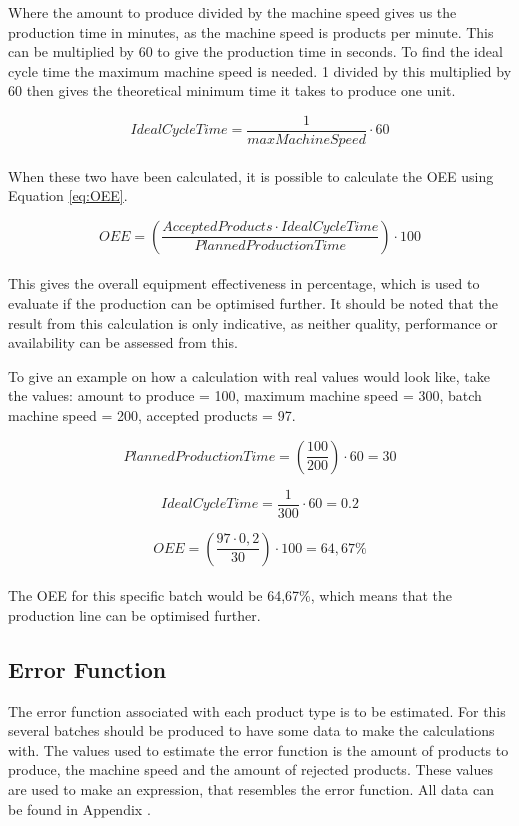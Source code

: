 Where the amount to produce divided by the machine speed gives us the production
time in minutes, as the machine speed is products per minute. This can be
multiplied by 60 to give the production time in seconds. To find the ideal cycle
time the maximum machine speed is needed. 1 divided by this multiplied by 60
then gives the theoretical minimum time it takes to produce one unit.

\[IdealCycleTime = \frac{1}{maxMachineSpeed}\cdot60\]\\

When these two have been calculated, it is possible to calculate the OEE using
Equation \ref{eq:OEE}.

\[OEE = \left(\frac{AcceptedProducts\cdot{IdealCycleTime}}{PlannedProductionTime}\right)\cdot100\]\\

This gives the overall equipment effectiveness in percentage, which is used to
evaluate if the production can be optimised further. It should be noted that
the result from this calculation is only indicative, as neither quality,
performance or availability can be assessed from this.

To give an example on how a calculation with real values would look like, take
the values: amount to produce = 100, maximum machine speed = 300, batch machine
speed = 200, accepted products = 97.

\[PlannedProductionTime = \left(\frac{100}{200}\right)\cdot60 = 30\]

\[IdealCycleTime = \frac{1}{300}\cdot60=0.2\]

\[OEE = \left(\frac{97\cdot0,2}{30}\right)\cdot100 = 64,67\%\]\\

The OEE for this specific batch would be 64,67\%, which means that the
production line can be optimised further. 

\subsection{Error Function}
The error function associated with each product type is to be estimated. For
this several batches should be produced to have some data to make the
calculations with. The values used to estimate the error function is the amount
of products to produce, the machine speed and the amount of rejected products.
These values are used to make an expression, that resembles the error function. 
All data can be found in Appendix .


